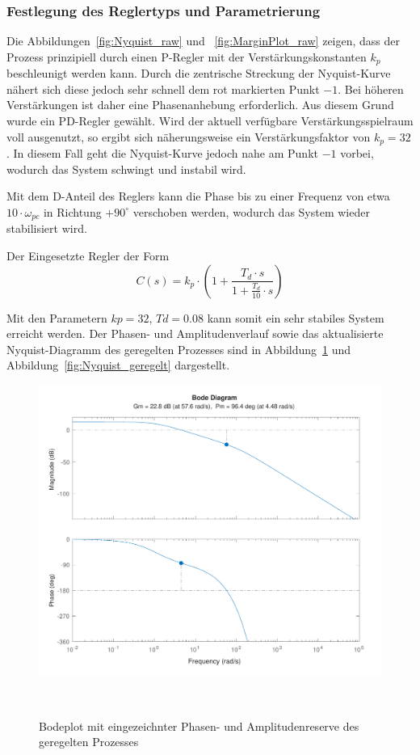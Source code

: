 \documentclass[main.tex]{subfiles} %
\begin{document}
\subsubsection*{Festlegung des Reglertyps und Parametrierung}

Die Abbildungen~\ref{fig:Nyquist_raw} und ~\ref{fig:MarginPlot_raw} zeigen,
dass der Prozess prinzipiell durch einen P-Regler mit der
Verstärkungskonstanten $k_p$ beschleunigt werden kann. Durch die zentrische
Streckung der Nyquist-Kurve nähert sich diese jedoch sehr schnell dem rot
markierten Punkt $-1$. Bei höheren Verstärkungen ist daher eine Phasenanhebung
erforderlich. Aus diesem Grund wurde ein PD-Regler gewählt. Wird der aktuell
verfügbare Verstärkungsspielraum voll ausgenutzt, so ergibt sich näherungsweise
ein Verstärkungsfaktor von $k_p = 32$. In diesem Fall geht die Nyquist-Kurve
jedoch nahe am Punkt $-1$ vorbei, wodurch das System schwingt und instabil
wird.

Mit dem D-Anteil des Reglers kann die Phase bis zu einer Frequenz von etwa $10
    \cdot \omega_{pc}$ in Richtung $+90^\circ$ verschoben werden, wodurch das
System wieder stabilisiert wird.

Der Eingesetzte Regler der Form
\[
    C(s) = k_p \cdot (1 + \frac{T_d \cdot s}{1 + \frac{T_d}{10} \cdot s})
\]

Mit den Parametern $kp = 32$, $Td = 0.08$ kann somit ein sehr stabiles System
erreicht werden. Der Phasen- und Amplitudenverlauf sowie das aktualisierte
Nyquist-Diagramm des geregelten Prozesses sind in
Abbildung~\ref{fig:MarginPlot_geregelt} und
Abbildung~\ref{fig:Nyquist_geregelt} dargestellt.

\begin{figure}[H]
    \centering
    \includegraphics[width=0.5\linewidth]{fig_Parametrierung_Linienfolgeregler/Bode_Plot_Prozess_geregelt.pdf}
    \caption{Bodeplot mit eingezeichnter Phasen- und Amplitudenreserve des geregelten Prozesses}~\label{fig:MarginPlot_geregelt}
\end{figure}
\end{document}
